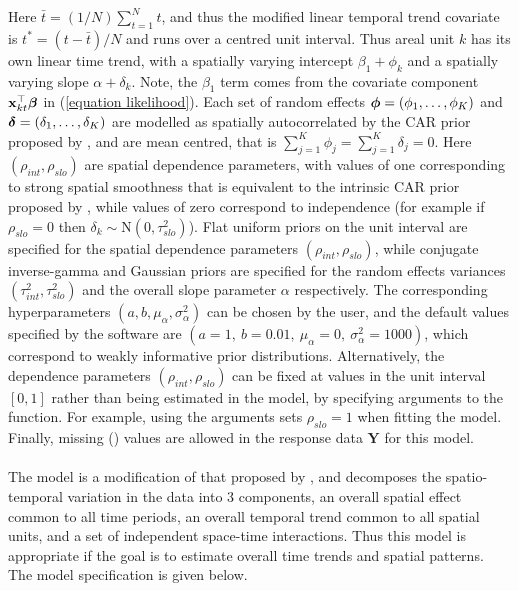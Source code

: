 \documentclass[article, nojss]{jss}
\newcommand{\bd}[1]{\ensuremath{\mbox{\boldmath $#1$}}}
\begin{document}
Here $\bar{t}=(1/N)\sum_{t=1}^N t$, and thus the modified linear temporal trend covariate is $t^{*}=(t - \bar{t})/N$ and runs over a centred unit interval.  Thus areal unit $k$ has its own linear time trend, with a spatially varying intercept $\beta_{1}+\phi_{k}$ and a spatially varying slope $\alpha+\delta_{k}$. Note, the $\beta_1$ term comes from the covariate component $\mathbf{x}_{kt}^{\top}\bd{\beta}$ in (\ref{equation likelihood}). Each set of random effects $\bd{\phi}=(\phi_1,\ldots,\phi_K)$ and  $\bd{\delta}=(\delta_1,\ldots,\delta_K)$ are modelled as spatially autocorrelated by the CAR prior proposed by \cite{leroux2000}, and are mean centred, that is $\sum_{j=1}^{K}\phi_{j}=\sum_{j=1}^{K}\delta_{j}=0$. Here $(\rho_{int}, \rho_{slo})$ are spatial dependence parameters, with values of one corresponding to strong spatial smoothness that is equivalent to the intrinsic CAR prior proposed by  \cite{besag1991}, while values of zero correspond to independence (for example if $\rho_{slo}=0$ then $\delta_k\sim\mbox{N}(0, \tau^2_{slo})$). Flat uniform priors on the unit interval are specified for the spatial dependence parameters $(\rho_{int}, \rho_{slo})$, while conjugate inverse-gamma and Gaussian priors are specified for the random effects variances $(\tau^2_{int}, \tau^2_{slo})$ and the overall slope parameter $\alpha$ respectively. The corresponding hyperparameters $(a, b, \mu_{\alpha}, \sigma^2_{\alpha})$ can be chosen by the user, and the default values specified by the software are $(a=1, ~b=0.01,~ \mu_{\alpha}=0,~ \sigma^2_{\alpha}=1000)$, which correspond to weakly informative prior distributions. Alternatively, the dependence parameters $(\rho_{int}, \rho_{slo})$ can be fixed at values in the unit interval $[0,1]$ rather than being estimated in the model, by specifying arguments to the  function. For example, using the arguments  sets $\rho_{slo}=1$ when fitting the model. Finally, missing () values are allowed in the response data $\mathbf{Y}$ for this model.\\

\\
The model is a  modification of that proposed by \cite{knorrheld2000},  and decomposes the spatio-temporal variation in the data into 3 components, an overall spatial effect common to all time periods, an overall temporal trend common to all spatial units, and a set of independent space-time interactions. Thus this model is appropriate if the goal is to estimate overall time trends and spatial patterns. The model specification is given below.
\end{document}
